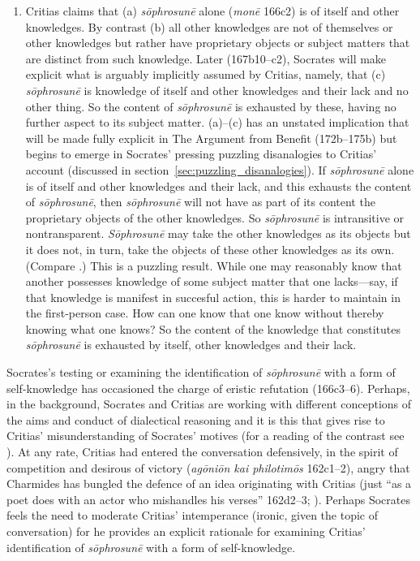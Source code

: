 \begin{enumerate}[(1)]
	\item Critias claims that (a) \emph{sōphrosunē} alone (\emph{monē} 166c2) is of itself and other knowledges. By contrast (b) all other knowledges are not of themselves or other knowledges but rather have proprietary objects or subject matters that are distinct from such knowledge. Later (167b10–c2), Socrates will make explicit what is arguably implicitly assumed by Critias, namely, that (c) \emph{sōphrosunē} is knowledge of itself and other knowledges and their lack and no other thing. So the content of \emph{sōphrosunē} is exhausted by these, having no further aspect to its subject matter. (a)–(c) has an unstated implication that will be made fully explicit in The Argument from Benefit (172b–175b) but begins to emerge in Socrates' pressing puzzling disanalogies to Critias' account (discussed in section~\ref{sec:puzzling_disanalogies}). If \emph{sōphrosunē} alone is of itself and other knowledges and their lack, and this exhausts the content of \emph{sōphrosunē}, then \emph{sōphrosunē} will not have as part of its content the proprietary objects of the other knowledges. So \emph{sōphrosunē} is intransitive or nontransparent. \emph{Sōphrosunē} may take the other knowledges as its objects but it does not, in turn, take the objects of these other knowledges as its own. (Compare \citealt[190]{Tsouna:2022aa}.) This is a puzzling result. While one may reasonably know that another possesses knowledge of some subject matter that one lacks—say, if that knowledge is manifest in succesful action, this is harder to maintain in the first-person case. How can one know that one know without thereby knowing what one knows? So the content of the knowledge that constitutes \emph{sōphrosunē} is exhausted by itself, other knowledges and their lack.
\end{enumerate}

Socrates's testing or examining the identification of \emph{sōphrosunē} with a form of self-knowledge has occasioned the charge of eristic refutation (166c3–6). Perhaps, in the background, Socrates and Critias are working with different conceptions of the aims and conduct of dialectical reasoning and it is this that gives rise to Critias' misunderstanding of Socrates' motives (for a reading of the contrast see \citealt[chapter 4]{Schmid:1998aa}). At any rate, Critias had entered the conversation defensively, in the spirit of competition and desirous of victory (\emph{agōniōn kai philotimōs} 162c1–2), angry that Charmides has bungled the defence of an idea originating with Critias (just ``as a poet does with an actor who mishandles his verses'' 162d2–3; \citealt[41]{Lamb:1927qw}). Perhaps Socrates feels the need to moderate Critias' intemperance (ironic, given the topic of conversation) for he provides an explicit rationale for examining Critias' identification of \emph{sōphrosunē} with a form of self-knowledge.

